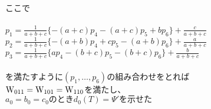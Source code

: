 \documentclass[12pt]{jsarticle}
\begin{document}
ここで\\\\
$p_1=\frac{1}{a+b+c}\{-(a+c)p_4-(a+c)p_5+bp_6\}+\frac{c}{a+b+c}$\\
$p_2=\frac{1}{a+b+c}\{-(a+b)p_4+cp_5-(a+b)p_6\}+\frac{a}{a+b+c}$\\
$p_3=\frac{1}{a+b+c}\{ap_4-(b+c)p_5-(b+c)p_6\}+\frac{b}{a+b+c}$\\\\
を満たすように$(p_1,\ldots,p_6)の組み合わせをとれば$\\
${\rm W_{011}}={\rm W_{101}}={\rm W_{110}} $を満たし、\\
$a_0=b_0=c_0のときd_0(T)=\Psi 'を示せた$\\
\end{document}
